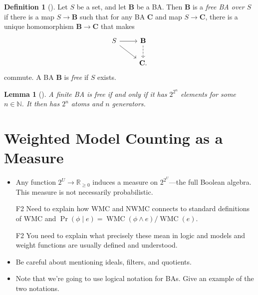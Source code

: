 \documentclass{article}
\newtheorem{lemma}{Lemma}
\theoremstyle{definition}
\newtheorem{definition}{Definition}
\theoremstyle{remark}
\DeclareMathOperator{\WMC}{WMC}
\begin{document}
\begin{definition}[\cite{koppelberg1989handbook}]
  Let $S$ be a set, and let $\mathbf{B}$ be a BA. Then $\mathbf{B}$ is a
  \emph{free BA over $S$} if there is a map $S \to \mathbf{B}$ such that for any
  BA $\mathbf{C}$ and map $S \to \mathbf{C}$, there is a unique homomorphism
  $\mathbf{B} \to \mathbf{C}$ that makes
  \[
    \begin{tikzcd}
      S \ar[rd] \ar[r] & \mathbf{B} \ar[d,dashed] \\
      & \mathbf{C}.
    \end{tikzcd}
  \]
  commute. A BA $\mathbf{B}$ is \emph{free} if $S$ exists.
\end{definition}

\begin{lemma}[\cite{sikorski1969boolean}] \label{lemma:finite_and_free}
  A finite BA is free if and only if it has $2^{2^n}$ elements for some $n \in
  \mathbb{N}$. It then has $2^n$ atoms and $n$ generators.
\end{lemma}

\section{Weighted Model Counting as a Measure}

\begin{itemize}
\item Any function $2^U \to \mathbb{R}_{\ge 0}$ induces a measure on
  $2^{2^U}$---the full Boolean algebra. This measure is not necessarily
  probabilistic.
\item[F2] Need to explain how WMC and NWMC connects to standard definitions of
  WMC and $\Pr(\phi \mid e) = \WMC(\phi \land e)/\WMC(e)$.
\item[F2] You need to explain what precisely these mean in logic and models
  and weight functions are usually defined and understood.
\item Be careful about mentioning ideals, filters, and quotients.
\item Note that we're going to use logical notation for BAs. Give an example of
  the two notations.
\end{itemize}
\end{document}
